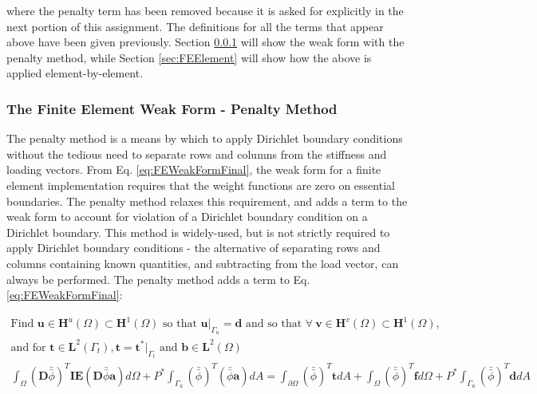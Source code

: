 \documentclass[10pt]{article}
\begin{document}
where the penalty term has been removed because it is asked for explicitly in the next portion of this assignment. The definitions for all the terms that appear above have been given previously. Section \ref{sec:Penalty} will show the weak form with the penalty method, while Section \ref{sec:FEElement} will show how the above is applied element-by-element.

\subsubsection{The Finite Element Weak Form - Penalty Method}
\label{sec:Penalty}

The penalty method is a means by which to apply Dirichlet boundary conditions without the tedious need to separate rows and columns from the stiffness and loading vectors. From Eq. \eqref{eq:FEWeakFormFinal}, the weak form for a finite element implementation requires that the weight functions are zero on essential boundaries. The penalty method relaxes this requirement, and adds a term to the weak form to account for violation of a Dirichlet boundary condition on a Dirichlet boundary. This method is widely-used, but is not strictly required to apply Dirichlet boundary conditions - the alternative of separating rows and columns containing known quantities, and subtracting from the load vector, can always be performed. The penalty method adds a term to Eq. \eqref{eq:FEWeakFormFinal}:

\begin{tcolorbox}
\begin{equation}
\label{eq:WeakFormPenalty}
\begin{aligned}
\text{Find }\textbf{u}\in \textbf{H}^u(\Omega)\subset \textbf{H}^1(\Omega) \text{ so that } \textbf{u}|_{\Gamma_u}=\textbf{d} \text{ and so that }\forall\ \textbf{v} \in \textbf{H}^v(\Omega)\subset \textbf{H}^1(\Omega),\\
\text{and for }\textbf{t}\in\textbf{L}^2(\Gamma_t), \textbf{t}=\textbf{t}^{*}|_{\Gamma_t}\text{ and }\textbf{b}\in\textbf{L}^2(\Omega)\\
\int_{\Omega}(\textbf{D}\bar{\bar{\phi}})^T\textbf{IE}(\textbf{D}\bar{\bar{\phi}}\textbf{a})d\Omega +P^{*}\int_{\Gamma_u}(\bar{\bar{\phi}})^T(\bar{\bar{\phi}}\textbf{a})dA=\int_{\partial\Omega}(\bar{\bar{\phi}})^T\textbf{t}dA+\int_{\Omega}(\bar{\bar{\phi}})^T\textbf{f}d\Omega+P^{*}\int_{\Gamma_u}(\bar{\bar{\phi}})^T\textbf{d}dA\\
\end{aligned}
\end{equation}
\end{tcolorbox}
\end{document}
